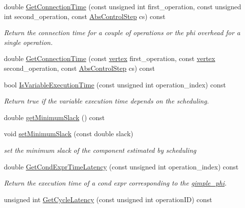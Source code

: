 \begin{DoxyCompactItemize}
\item 
double \hyperlink{classAllocationInformation_ae342b26bfe5993d1580c406ceb3cf9d3}{Get\+Connection\+Time} (const unsigned int first\+\_\+operation, const unsigned int second\+\_\+operation, const \hyperlink{structAbsControlStep}{Abs\+Control\+Step} cs) const
\begin{DoxyCompactList}\small\item\em Return the connection time for a couple of operations or the phi overhead for a single operation. \end{DoxyCompactList}\item 
double \hyperlink{classAllocationInformation_a22ad03a89978213b6b8d198f04f0ecad}{Get\+Connection\+Time} (const \hyperlink{graph_8hpp_abefdcf0544e601805af44eca032cca14}{vertex} first\+\_\+operation, const \hyperlink{graph_8hpp_abefdcf0544e601805af44eca032cca14}{vertex} second\+\_\+operation, const \hyperlink{structAbsControlStep}{Abs\+Control\+Step} cs) const
\item 
bool \hyperlink{classAllocationInformation_a57b2fe03c5c482134de341b1368f8533}{Is\+Variable\+Execution\+Time} (const unsigned int operation\+\_\+index) const
\begin{DoxyCompactList}\small\item\em Return true if the variable execution time depends on the scheduling. \end{DoxyCompactList}\item 
double \hyperlink{classAllocationInformation_a3c65f1874a9c81a9aeaaa81867dfc2d0}{get\+Minimum\+Slack} () const
\item 
void \hyperlink{classAllocationInformation_a84649ecfe63d3cca639663ab1a01fc91}{set\+Minimum\+Slack} (const double slack)
\begin{DoxyCompactList}\small\item\em set the minimum slack of the component estimated by scheduling \end{DoxyCompactList}\item 
double \hyperlink{classAllocationInformation_a9481db5ab9c2a29958fa5c3da7bfeded}{Get\+Cond\+Expr\+Time\+Latency} (const unsigned int operation\+\_\+index) const
\begin{DoxyCompactList}\small\item\em Return the execution time of a cond expr corresponding to the \hyperlink{structgimple__phi}{gimple\+\_\+phi}. \end{DoxyCompactList}\item 
unsigned int \hyperlink{classAllocationInformation_a317fc959fa03d6e4c9e66c4091a2bff5}{Get\+Cycle\+Latency} (const unsigned int operation\+ID) const

\end{DoxyCompactItemize}
